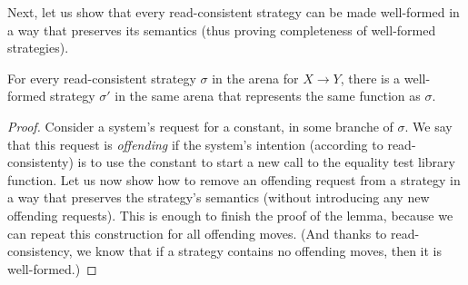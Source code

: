 Next, let us show that every read-consistent strategy can be made well-formed in a way that preserves its semantics
(thus proving completeness of well-formed strategies). 
\begin{lemma}\label{lem:all-well-formed}
    For every read-consistent strategy $\sigma$ in the arena for $X \to Y$,
    there is a well-formed strategy $\sigma'$ in the same arena that represents the same function as $\sigma$.
\end{lemma}
\begin{proof}
    Consider a system's request for a constant, in some branche of $\sigma$. 
    We say that this request is \emph{offending} if the system's intention (according to read-consistenty) is to use
    the constant to start a new call to the equality test library function.
    Let us now show how to remove an offending request from a strategy in a way that preserves the strategy's semantics
    (without introducing any new offending requests). This is enough to finish the proof of the lemma,
    because we can repeat this construction for all offending moves. (And thanks to read-consistency, we know that 
    if a strategy contains no offending moves, then it is well-formed.)


\end{proof}
